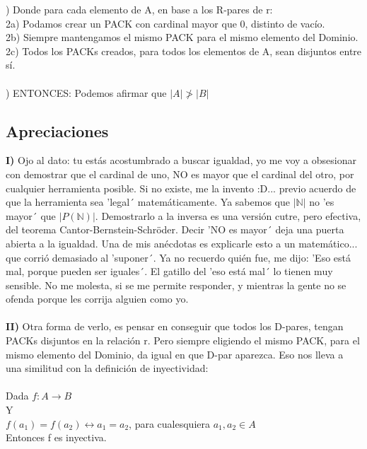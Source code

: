 	) Donde para cada elemento de A, en base a los R-pares de r:\\
	2a) Podamos crear un PACK con cardinal mayor que 0, distinto de vacío.\\
	2b) Siempre mantengamos el mismo PACK para el mismo elemento del Dominio.\\
	2c) Todos los PACKs creados, para todos los elementos de A, sean disjuntos entre sí.
	\\\\
	
	) ENTONCES: Podemos afirmar que $|A| \ngtr |B|$
	
	
	\subsection{Apreciaciones}
	
	\noindent
	\textbf{I)} Ojo al dato: tu estás acostumbrado a buscar igualdad, yo me voy a obsesionar con demostrar que el cardinal de uno, NO es mayor que el cardinal del otro, por cualquier herramienta posible. Si no existe, me la invento :D... previo acuerdo de que la herramienta sea 'legal´ matemáticamente. Ya sabemos que $|\mathbb{N}|$ no 'es mayor´ que $|P(\mathbb{N})|$. Demostrarlo a la inversa es una versión cutre, pero efectiva, del teorema Cantor-Bernstein-Schröder. Decir 'NO es mayor´ deja una puerta abierta a la igualdad. Una de mis anécdotas es explicarle esto a un matemático... que corrió demasiado al 'suponer´. Ya no recuerdo quién fue, me dijo: 'Eso está mal, porque pueden ser iguales´. El gatillo del 'eso está mal´ lo tienen muy sensible. No me molesta, si se me permite responder, y mientras la gente no se ofenda porque les corrija alguien como yo.\\\\
	
	\noindent
	\textbf{II)} Otra forma de verlo, es pensar en conseguir que todos los D-pares, tengan PACKs disjuntos en la relación r. Pero siempre eligiendo el mismo PACK, para el mismo elemento del Dominio, da igual en que D-par aparezca. Eso nos lleva a una similitud con la definición de inyectividad:\\\\
	Dada $f: A \rightarrow B$\\
	Y\\
	$f(a_{1}) = f(a_{2}) \leftrightarrow a_{1} = a_{2}$, para cualesquiera $a_{1},a_{2} \in A$\\
	Entonces f es inyectiva.\\\\
	
